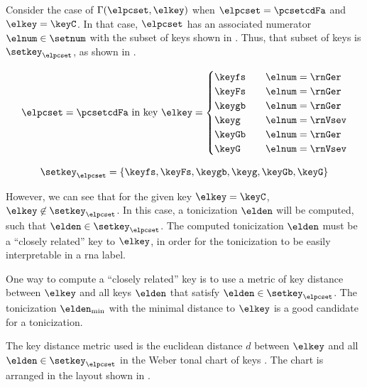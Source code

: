 
Consider the case of $\Gamma(\elpcset, \elkey)$ when
$\elpcset = \pcsetcdFa$ and $\elkey = \keyC$. In that case,
$\elpcset$ has an associated numerator $\elnum \in \setnum$
with the subset of keys shown in .
Thus, that subset of keys is $\setkey_\elpcset$, as shown in
. 

\begin{equation}
    \label{eq:key_not_found}
    \elpcset = \pcsetcdFa \text{ in key } \elkey =
    \begin{cases}
        \keyfs & \quad \elnum = \rnGer \\
        \keyFs & \quad \elnum = \rnGer \\
        \keygb & \quad \elnum = \rnGer \\
        \keyg  & \quad \elnum = \rnVsev \\
        \keyGb & \quad \elnum = \rnGer \\
        \keyG  & \quad \elnum = \rnVsev \\
    \end{cases}
\end{equation}

\begin{equation}
    \label{eq:key_not_found2}
    \setkey_\elpcset = \{ \keyfs, \keyFs, \keygb, \keyg, \keyGb, \keyG \}
\end{equation}

However, we can see that for the given key $\elkey = \keyC$,
$\elkey \not\in \setkey_\elpcset$. In this case, a
tonicization $\elden$ will be computed, such that $\elden
\in \setkey_\elpcset$. The computed tonicization $\elden$
must be a ``closely related'' key to $\elkey$, in order for
the tonicization to be easily interpretable in a \gls{rna}
label.

One way to compute a ``closely related'' key is to use a
metric of key distance between $\elkey$ and all keys
$\elden$ that satisfy $\elden \in \setkey_\elpcset$. The
tonicization $\elden_{\min}$ with the minimal distance to
$\elkey$ is a good candidate for a tonicization.

The key distance metric used is the euclidean distance $d$
between $\elkey$ and all $\elden \in \setkey_\elpcset$ in
the Weber tonal chart of keys \parencite{weber1818versuch}.
The chart is arranged in the layout shown in
.


